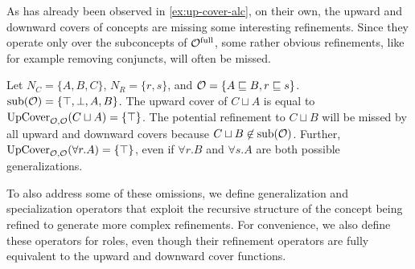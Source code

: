 As has already been observed in \cref{ex:up-cover-alc}, on their own, the upward and downward covers of concepts are missing some interesting refinements. Since they operate only over the subconcepts of ${\mathcal{O}^\textnormal{full}}$, some rather obvious refinements, like for example removing conjuncts, will often be missed.
\begin{example} \label{exa:up-cover}
  Let $N_C = \{A, B, C\}$, $N_R = \{ r, s \}$, and $\mathcal{O} = \{A \sqsubseteq B, r \sqsubseteq s\}$. ${\operatorname{sub}}(\mathcal{O}) = \{\top, \bot, A, B\}$. The upward cover of $C \sqcup A$ is equal to ${\operatorname{UpCover}}_{\mathcal{O},\mathcal{O}}(C \sqcup A) = \{ \top \}$. The potential refinement to $C \sqcup B$ will be missed by all upward and downward covers because $C \sqcup B \not\in {\ensuremath{\operatorname{sub}}}(\mathcal{O})$. Further, ${\operatorname{UpCover}}_{\mathcal{O},\mathcal{O}}(\forall r.A) = \{ \top \}$, even if $\forall r.B$ and $\forall s.A$ are both possible generalizations.
\end{example}

To also address some of these omissions, we define generalization and specialization operators that exploit the recursive structure of the concept being refined to generate more complex refinements. For convenience, we also define these operators for roles, even though their refinement operators are fully equivalent to the upward and downward cover functions.

